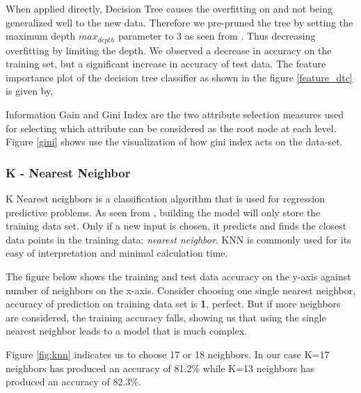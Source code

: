 \documentclass[conference]{IEEEtran}
\begin{document}
When applied directly, Decision Tree causes the overfitting on \cite{monoclonal1} and not being generalized well to the new data. Therefore we pre-pruned the tree by setting the maximum depth $max_{depth}$ parameter to 3 as seen from \cite{dt}. Thus decreasing overfitting by limiting the depth. We observed a decrease in accuracy on the training set, but a significant increase in accuracy of test data. The feature importance plot of the decision tree classifier as shown in the figure \ref{feature_dtc} is given by,

Information Gain and Gini Index are the two attribute selection measures used for selecting which attribute can be considered as the root node at each level. Figure \ref{gini} shows use the visualization of how gini index acts on the data-set.


\subsubsection*{K - Nearest Neighbor}
K Nearest neighbors is a classification algorithm that is used for regression predictive problems. As seen from \cite{knn}, building the model will only store the training data set. Only if a new input is chosen, it predicts and finds the closest data points in the training data: \textit{nearest neighbor}. KNN is commonly used for its easy of interpretation and minimal calculation time.
\par
The figure below shows the training and test data accuracy on the y-axis against number of neighbors on the x-axis. Consider choosing one single nearest neighbor, accuracy of prediction on training data set is \textbf{1}, perfect. But if more neighbors are considered, the training accuracy falls, showing us that using the single nearest neighbor leads to a model that is much complex.


\par
Figure \ref{fig:knn} indicates us to choose 17 or 18 neighbors. In our case K=17 neighbors has produced an accuracy of 81.2\% while K=13 neighbors has produced an accuracy of 82.3\%.
\end{document}
